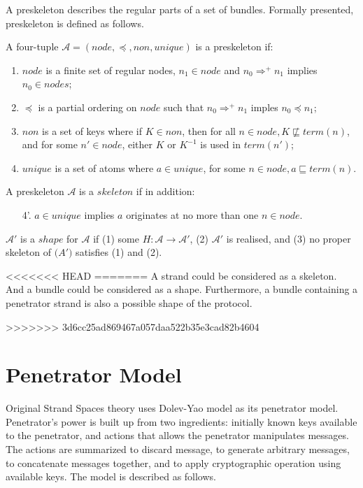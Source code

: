 A preskeleton describes the regular parts of a set of bundles. Formally presented, preskeleton is defined as follows.
\begin{Definition}[Skeleton]A four-tuple $\mathcal{A} = (node, \preceq, non, unique)$ is a preskeleton if:
	\begin{enumerate}
	\item $node$ is a finite set of regular nodes, $n_1 \in node$ and $n_0 \Rightarrow^+ n_1$ implies $n_0 \in nodes$;
	\item $\preceq$ is a partial ordering on $node$ such that $n_0 \Rightarrow^+ n_1$ imples $n_0 \preceq n_1$;
	\item $non$ is a set of keys where if $K \in non$, then for all $n \in node, K\not\sqsubseteq term(n)$, and for some $n' \in node$, either $K$ or $K^{-1}$ is used in $term(n')$;
	\item $unique$ is a set of atoms where $a \in unique$, for some $n \in node, a \sqsubseteq term(n)$. 
	\end{enumerate}
	A preskeleton $\mathcal{A}$ is a $skeleton$ if in addition:
	\begin{enumerate}
	\item[4'.] $a\in unique$ implies $a$ originates at no more than one $n\in node$. 
	\end{enumerate}
\end{Definition}

\begin{Definition}[Shape] $\mathcal{A}'$ is a $shape$ for $\mathcal{A}$ if (1) some $H : \mathcal{A} \rightarrow \mathcal{A'}$, (2) $\mathcal{A'}$ is realised, and (3) no proper skeleton of $\mathcal(A')$ satisfies (1) and (2). 
\end{Definition}

<<<<<<< HEAD
=======
A strand could be considered as a skeleton. And a bundle could be considered as a shape. Furthermore, a bundle containing a penetrator strand is also a possible shape of the protocol. 

>>>>>>> 3d6cc25ad869467a057daa522b35e3cad82b4604
\section{Penetrator Model}

Original Strand Spaces theory uses Dolev-Yao \cite{dolev-yao} model as its penetrator model. Penetrator's power is built up from two ingredients: initially known keys available to the penetrator, and actions that allows the penetrator manipulates messages. The actions are summarized to discard message, to generate arbitrary messages, to concatenate messages together, and to apply cryptographic operation using available keys. The model is described as follows. 

